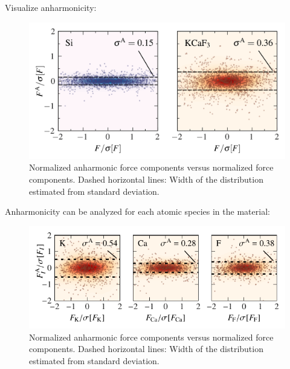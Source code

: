Visualize anharmonicity:

\begin{figure}
	\includegraphics[width=\textwidth]{./data/plots/anharmonicity/5_density_plots/histogram_annotated.png}
	\caption{
		Normalized anharmonic force components versus normalized force components. Dashed horizontal lines: Width of the distribution estimated from standard deviation.
	}
\end{figure}

Anharmonicity can be analyzed for each atomic species in the material:

\begin{figure}
	\includegraphics[width=\textwidth]{./data/plots/anharmonicity/5_density_plots/histogram_atoms.pdf}
	\caption{
		Normalized anharmonic force components versus normalized force components. Dashed horizontal lines: Width of the distribution estimated from standard deviation.
	}
\end{figure}

%
%

